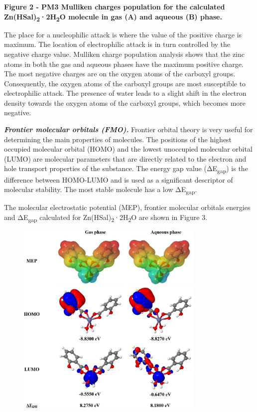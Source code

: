 {\bfseries Figure 2 - PM3 Mulliken charges population for the calculated
Zn(HSal)\textsubscript{2}·2H\textsubscript{2}O molecule in gas (A) and
aqueous (B) phase.}

The place for a nucleophilic attack is where the value of the positive
charge is maximum. The location of electrophilic attack is in turn
controlled by the negative charge value. Mulliken charge population
analysis shows that the zinc atoms in both the gas and aqueous phases
have the maximum positive charge. The most negative charges are on the
oxygen atoms of the carboxyl groups. Consequently, the oxygen atoms of
the carboxyl groups are most susceptible to electrophilic attack. The
presence of water leads to a slight shift in the electron density
towards the oxygen atoms of the carboxyl groups, which becomes more
negative.

\emph{{\bfseries Frontier molecular orbitals (FMO).}} Frontier orbital
theory is very useful for determining the main properties of molecules.
The positions of the highest occupied molecular orbital (HOMO) and the
lowest unoccupied molecular orbital (LUMO) are molecular parameters that
are directly related to the electron and hole transport properties of
the substance. The energy gap value (ΔE\textsubscript{gap}) is the
difference between HOMO-LUMO and is used as a significant descriptor of
molecular stability. The most stable molecule has a low
ΔE\textsubscript{gap}.

The molecular electrostatic potential (MEP), frontier molecular orbitals
energies and ΔE\textsubscript{gap} calculated for
Zn(HSal)\textsubscript{2}·2H\textsubscript{2}O are shown in Figure 3.

\begin{figure}[H]
	\centering
	\includegraphics[width=0.8\textwidth]{assets/41}
	\caption*{}
\end{figure}

